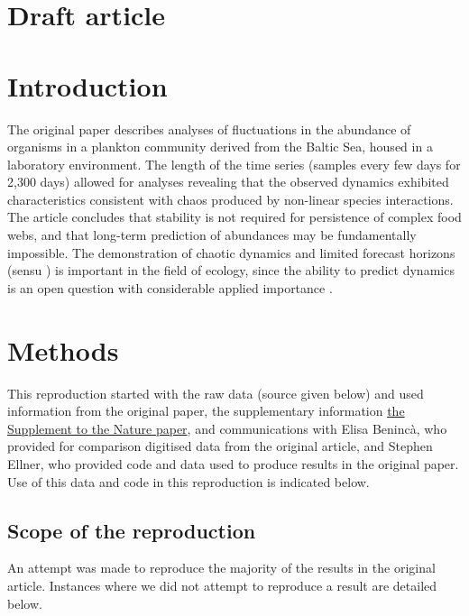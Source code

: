 \documentclass[10pt,a4paper,onecolumn]{article}
\begin{document}
\section{Draft article}\label{draft-article}

\section{Introduction}\label{introduction}

The original paper describes analyses of fluctuations in the abundance
of organisms in a plankton community derived from the Baltic Sea, housed
in a laboratory environment. The length of the time series (samples
every few days for 2,300 days) allowed for analyses revealing that the
observed dynamics exhibited characteristics consistent with chaos
produced by non-linear species interactions. The article concludes that
stability is not required for persistence of complex food webs, and that
long-term prediction of abundances may be fundamentally impossible. The
demonstration of chaotic dynamics and limited forecast horizons (sensu
\textcite{Petchey2015}) is important in the field of ecology, since the
ability to predict dynamics is an open question with considerable
applied importance \textcite{Petchey2015} \textcite{Mouquet2015}.

\section{Methods}\label{methods}

This reproduction started with the raw data (source given below) and
used information from the original paper, the supplementary information
\href{http://www.nature.com/nature/journal/v451/n7180/extref/nature06512-s1.pdf}{the
Supplement to the Nature paper}, and communications with Elisa Benincà,
who provided for comparison digitised data from the original article,
and Stephen Ellner, who provided code and data used to produce results
in the original paper. Use of this data and code in this reproduction is
indicated below.

\subsection{Scope of the reproduction}\label{scope-of-the-reproduction}

An attempt was made to reproduce the majority of the results in the
original article. Instances where we did not attempt to reproduce a
result are detailed below.
\end{document}
